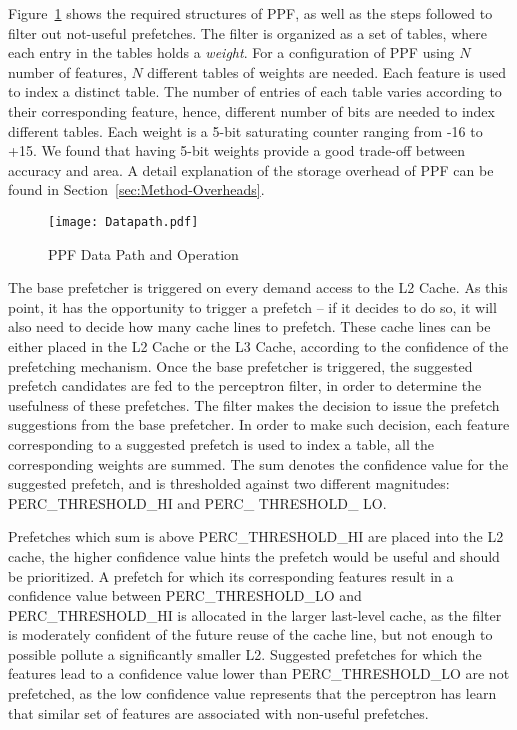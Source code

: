 Figure~\ref{fig:PPF_Datapath} shows the required structures of PPF, as well as the
steps followed to filter out not-useful prefetches.
The filter is organized as a set of tables, where each entry in the tables holds 
a \textit{weight}. For a configuration of PPF using $N$ number of features, 
$N$ different tables of weights are needed. Each feature is used to index 
a distinct table. The number of entries of each table varies according
to their corresponding feature, hence, different
number of bits are needed to index different tables.
Each weight is a 5-bit saturating counter ranging from -16 to +15. 
We found that having 5-bit weights provide a good trade-off 
between accuracy and area. A detail explanation of the storage overhead of
PPF can be found in Section~\ref{sec:Method-Overheads}.

\begin{figure}
  \begin{center}
  \texttt{[image: Datapath.pdf]}
    \label{fig:PPF_Datapath}
  \caption{PPF Data Path and Operation}
  \end{center}
\end{figure}


\newline 


The base prefetcher is triggered on every demand access to the L2 Cache.  
As this point, it has the opportunity to trigger a prefetch  -- if it 
decides to do so, it will also need to decide how many cache lines
to prefetch.  These cache lines can be either placed in the L2 Cache or
the L3 Cache, according to the confidence of the prefetching mechanism.
Once the base prefetcher is triggered, the suggested
prefetch candidates are fed to the perceptron filter, 
in order to determine the usefulness of these prefetches.  
The filter makes the decision to issue the prefetch
suggestions from the base prefetcher.
In order to make such decision, each feature corresponding to a 
suggested prefetch is used to index a table, 
all the corresponding weights are summed. 
The sum denotes the confidence value for the suggested prefetch, 
and is thresholded against two different magnitudes:  
PERC\_THRESHOLD\_HI and PERC\_ THRESHOLD\_ LO. 

Prefetches which sum is above PERC\_THRESHOLD\_HI
are placed into the L2 cache, the higher confidence value
hints the prefetch would be useful and should be prioritized.
A prefetch for which its corresponding features result 
in a confidence value between  
PERC\_THRESHOLD\_LO and PERC\_THRESHOLD\_HI is allocated in the larger 
last-level cache, as the filter is moderately confident of the future reuse of the 
cache line, but not enough to possible pollute a significantly smaller L2. 
Suggested prefetches for which the features lead to a confidence value lower than 
PERC\_THRESHOLD\_LO are not prefetched, as the low confidence value 
represents that the perceptron has learn that similar set of features
are associated with non-useful prefetches. \newline 

